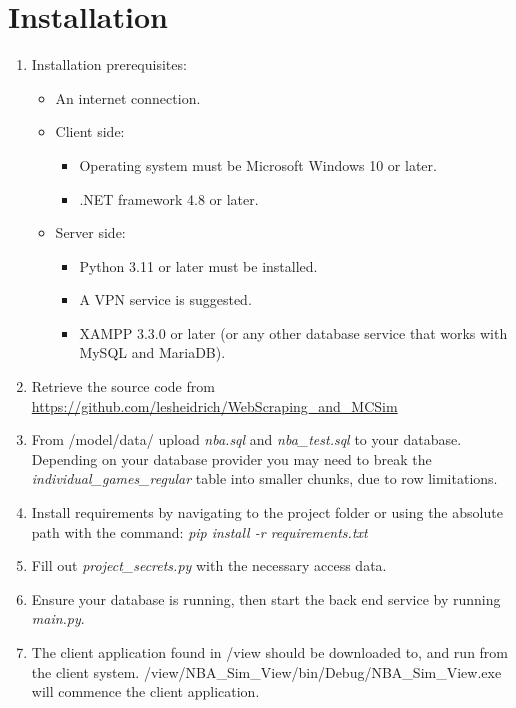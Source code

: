\documentclass{thesis-ekf}
\theoremstyle{definition}
\theoremstyle{remark}
\begin{document}
\section{Installation}
\begin{enumerate}
	\item Installation prerequisites:
	\begin{itemize}
		\item An internet connection.
		\item Client side:
		\begin{itemize}
			\item Operating system must be Microsoft Windows 10 or later.
			\item .NET framework 4.8 or later.
		\end{itemize}
		
		\item Server side:
		\begin{itemize}
			\item Python 3.11 or later must be installed.
			\item A VPN service is suggested.
			\item XAMPP 3.3.0 or later (or any other database service that works with MySQL and MariaDB).
		\end{itemize}
	\end{itemize}
	
	\item Retrieve the source code from \url{https://github.com/lesheidrich/WebScraping_and_MCSim}
	
	\item From /model/data/ upload \emph{nba.sql} and \emph{nba\_test.sql} to your database. Depending on your database provider you may need to break the \emph{individual\_games\_regular} table into smaller chunks, due to row limitations.
	
	\item Install requirements by navigating to the project folder or using the absolute path with the command: \emph{pip install -r requirements.txt}
	
	\item Fill out \emph{project\_secrets.py} with the necessary access data.
	
	\item Ensure your database is running, then start the back end service by running \emph{main.py}.
	
	\item The client application found in /view should be downloaded to, and run from the client system. /view/NBA\_Sim\_View/bin/Debug/NBA\_Sim\_View.exe will commence the client application.
\end{enumerate}
\end{document}
